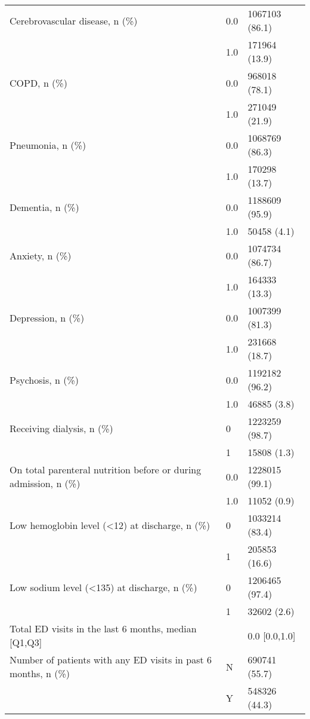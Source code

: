 \begin{tabular}{lll}
Cerebrovascular disease, n (\%) & 0.0 &     1067103 (86.1) \\
                                       & 1.0 &      171964 (13.9) \\
COPD, n (\%) & 0.0 &      968018 (78.1) \\
                                       & 1.0 &      271049 (21.9) \\
Pneumonia, n (\%) & 0.0 &     1068769 (86.3) \\
                                       & 1.0 &      170298 (13.7) \\
Dementia, n (\%) & 0.0 &     1188609 (95.9) \\
                                       & 1.0 &        50458 (4.1) \\
Anxiety, n (\%) & 0.0 &     1074734 (86.7) \\
                                       & 1.0 &      164333 (13.3) \\
Depression, n (\%) & 0.0 &     1007399 (81.3) \\
                                       & 1.0 &      231668 (18.7) \\
Psychosis, n (\%) & 0.0 &     1192182 (96.2) \\
                                       & 1.0 &        46885 (3.8) \\
Receiving dialysis, n (\%) & 0 &     1223259 (98.7) \\
                                       & 1 &        15808 (1.3) \\
On total parenteral nutrition before or during admission, n (\%) & 0.0 &     1228015 (99.1) \\
                                       & 1.0 &        11052 (0.9) \\
Low hemoglobin level (<12) at discharge, n (\%) & 0 &     1033214 (83.4) \\
                                       & 1 &      205853 (16.6) \\
Low sodium level (<135) at discharge, n (\%) & 0 &     1206465 (97.4) \\
                                       & 1 &        32602 (2.6) \\
Total ED visits in the last 6 months, median [Q1,Q3] &   &      0.0 [0.0,1.0] \\
Number of patients with any ED visits in past 6 months, n (\%) & N &      690741 (55.7) \\
                                       & Y &      548326 (44.3) \\

\end{tabular}
